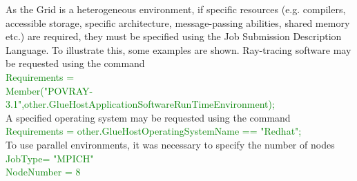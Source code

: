 As the Grid is a heterogeneous environment, if specific resources (e.g. compilers, accessible storage, specific architecture, message-passing abilities, shared memory etc.) are required, they must be specified using the Job Submission Description Language.
To illustrate this, some examples are shown.
Ray-tracing software may be requested using the command
\textcolor{green}
{\textsf {
\\Requirements = 
\\Member("POVRAY-3.1",other.GlueHostApplicationSoftwareRunTimeEnvironment);
}}
\\A specified operating system may be requested using the command
\textcolor{green}
{\textsf {
\\Requirements = other.GlueHostOperatingSystemName == "Redhat";
}}
\\To use parallel environments, it was necessary to specify the number of nodes
\textcolor{green}
{\textsf {
\\JobType= "MPICH"
\\NodeNumber = 8
}}

